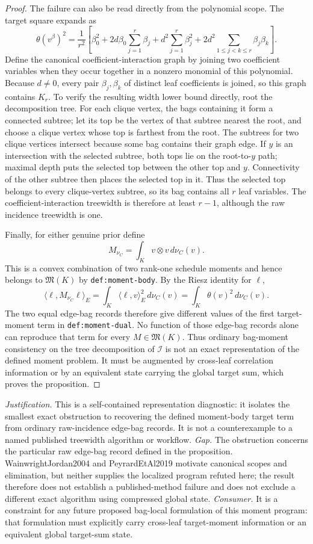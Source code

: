 \documentclass{article}
\begin{document}
\begin{proof}
The failure can also be read directly from the polynomial scope.  The target square expands as
\[
 \theta(v^\beta)^2
 =\frac1{r^2}\left[
 \beta_0^2+2d\beta_0\sum_{j=1}^r\beta_j
 +d^2\sum_{j=1}^r\beta_j^2
 +2d^2\sum_{1\le j<k\le r}\beta_j\beta_k
 \right].
\]
Define the canonical coefficient-interaction graph by joining two coefficient variables when they occur together in a nonzero monomial of this polynomial.  Because \(d\ne0\), every pair \(\beta_j,\beta_k\) of distinct leaf coefficients is joined, so this graph contains \(K_r\).  To verify the resulting width lower bound directly, root the decomposition tree.  For each clique vertex, the bags containing it form a connected subtree; let its top be the vertex of that subtree nearest the root, and choose a clique vertex whose top is farthest from the root.  The subtrees for two clique vertices intersect because some bag contains their graph edge.  If \(y\) is an intersection with the selected subtree, both tops lie on the root-to-\(y\) path; maximal depth puts the selected top between the other top and \(y\).  Connectivity of the other subtree then places the selected top in it.  Thus the selected top belongs to every clique-vertex subtree, so its bag contains all \(r\) leaf variables.  The coefficient-interaction treewidth is therefore at least \(r-1\), although the raw incidence treewidth is one.

Finally, for either genuine prior define
\[
 M_{\nu_C}=\int_K v\otimes v\,d\nu_C(v).
\]
This is a convex combination of two rank-one schedule moments and hence belongs to \(\mathfrak M(K)\) by \texttt{def:moment-body}.  By the Riesz identity for \(\ell\),
\[
 \langle\ell,M_{\nu_C}\ell\rangle_E
 =\int_K\langle\ell,v\rangle_E^2\,d\nu_C(v)
 =\int_K\theta(v)^2\,d\nu_C(v).
\]
The two equal edge-bag records therefore give different values of the first target-moment term in \texttt{def:moment-dual}.  No function of those edge-bag records alone can reproduce that term for every \(M\in\mathfrak M(K)\).  Thus ordinary bag-moment consistency on the tree decomposition of \(\mathcal I\) is not an exact representation of the defined moment problem.  It must be augmented by cross-leaf correlation information or by an equivalent state carrying the global target sum, which proves the proposition.
\end{proof}
\par\smallskip\noindent \textit{Justification.} This is a self-contained representation diagnostic: it isolates the smallest exact obstruction to recovering the defined moment-body target term from ordinary raw-incidence edge-bag records. It is not a counterexample to a named published treewidth algorithm or workflow. \textit{Gap.} The obstruction concerns the particular raw edge-bag record defined in the proposition. WainwrightJordan2004 and PeyrardEtAl2019 motivate canonical scopes and elimination, but neither supplies the localized program refuted here; the result therefore does not establish a published-method failure and does not exclude a different exact algorithm using compressed global state. \textit{Consumer.} It is a constraint for any future proposed bag-local formulation of this moment program: that formulation must explicitly carry cross-leaf target-moment information or an equivalent global target-sum state.
\end{document}
